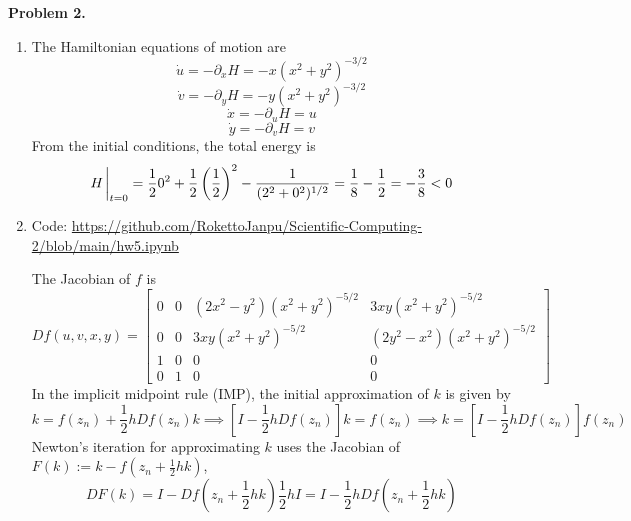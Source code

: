 \documentclass{article}
\def\tbf#1{\textbf{#1}}
\newcommand{\br}[1]{\left(#1\right)}
\newcommand{\sbr}[1]{\left[#1\right]}
\newcommand{\m}[2][b]{\begin{#1matrix}#2\end{#1matrix}}
\newcommand{\imp}{\implies}
\newcommand{\ptl}{\partial}
\begin{document}
\tbf{Problem 2.}

\begin{enumerate}[label=(\alph*)]
	
\item The Hamiltonian equations of motion are
$$\dot u = -\ptl_xH = -x(x^2+y^2)^{-3/2}$$
$$\dot v = -\ptl_yH = -y(x^2+y^2)^{-3/2}$$
$$\dot x = -\ptl_uH = u$$
$$\dot y = -\ptl_vH = v$$
From the initial conditions, the total energy is
$$H\eval_{t=0} = \frac120^2 + \frac12\br{\frac12}^2 - \frac{1}{(2^2+0^2)^{1/2}} = \frac18 - \frac12 = -\frac38 < 0$$


\item Code: \url{https://github.com/RokettoJanpu/Scientific-Computing-2/blob/main/hw5.ipynb}

The Jacobian of $f$ is
$$Df(u,v,x,y) = \m{
0 & 0 & (2x^2 - y^2)(x^2 + y^2)^{-5/2} & 3xy(x^2 + y^2)^{-5/2} \\
0 & 0 & 3xy(x^2 + y^2)^{-5/2} & (2y^2 - x^2)(x^2 + y^2)^{-5/2} \\
1 & 0 & 0 & 0\\
0 & 1 & 0 & 0
}$$
In the implicit midpoint rule (IMP), the initial approximation of $k$ is given by
$$k = f(z_n) + \frac12hDf(z_n)k
\imp \sbr{I - \frac12hDf(z_n)}k = f(z_n)
\imp k = \sbr{I - \frac12hDf(z_n)}f(z_n)$$
Newton's iteration for approximating $k$ uses the Jacobian of $F(k):=k-f(z_n+\frac12hk)$,
$$DF(k) = I - Df\br{z_n + \frac12hk}\frac12hI = I - \frac12hDf\br{z_n + \frac12hk}$$


\end{enumerate}
\end{document}
